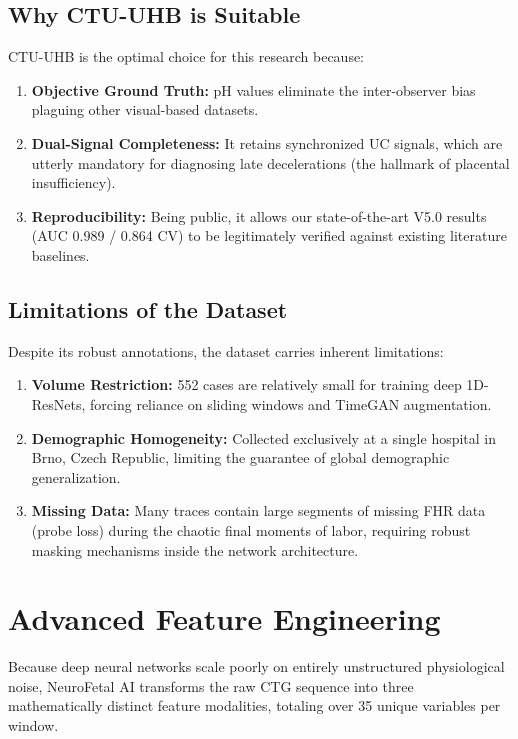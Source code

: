 \documentclass[12pt,a4paper]{report}
\begin{document}
\section{Why CTU-UHB is Suitable}
CTU-UHB is the optimal choice for this research because:
\begin{enumerate}
    \item \textbf{Objective Ground Truth:} pH values eliminate the inter-observer bias plaguing other visual-based datasets.
    \item \textbf{Dual-Signal Completeness:} It retains synchronized UC signals, which are utterly mandatory for diagnosing late decelerations (the hallmark of placental insufficiency).
    \item \textbf{Reproducibility:} Being public, it allows our state-of-the-art V5.0 results (AUC 0.989 / 0.864 CV) to be legitimately verified against existing literature baselines.
\end{enumerate}

\section{Limitations of the Dataset}
Despite its robust annotations, the dataset carries inherent limitations:
\begin{enumerate}
    \item \textbf{Volume Restriction:} 552 cases are relatively small for training deep 1D-ResNets, forcing reliance on sliding windows and TimeGAN augmentation.
    \item \textbf{Demographic Homogeneity:} Collected exclusively at a single hospital in Brno, Czech Republic, limiting the guarantee of global demographic generalization.
    \item \textbf{Missing Data:} Many traces contain large segments of missing FHR data (probe loss) during the chaotic final moments of labor, requiring robust masking mechanisms inside the network architecture.
\end{enumerate}

\chapter{Advanced Feature Engineering}
Because deep neural networks scale poorly on entirely unstructured physiological noise, NeuroFetal AI transforms the raw CTG sequence into three mathematically distinct feature modalities, totaling over 35 unique variables per window.
\end{document}
